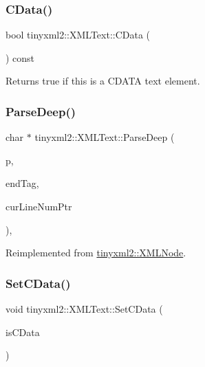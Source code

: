 \subsubsection{\texorpdfstring{C\+Data()}{CData()}}
{\footnotesize\ttfamily bool tinyxml2\+::\+X\+M\+L\+Text\+::\+C\+Data (\begin{DoxyParamCaption}{ }\end{DoxyParamCaption}) const\hspace{0.3cm}{\ttfamily [inline]}}



Returns true if this is a C\+D\+A\+TA text element. 

\mbox{\label{classtinyxml2_1_1_x_m_l_text_a9810dd9b82c9020baa0c3bdcb4469aac}} 
\subsubsection{\texorpdfstring{Parse\+Deep()}{ParseDeep()}}
{\footnotesize\ttfamily char $\ast$ tinyxml2\+::\+X\+M\+L\+Text\+::\+Parse\+Deep (\begin{DoxyParamCaption}\item[{char $\ast$}]{p,  }\item[{\hyperlink{classtinyxml2_1_1_str_pair}{Str\+Pair} $\ast$}]{end\+Tag,  }\item[{int $\ast$}]{cur\+Line\+Num\+Ptr }\end{DoxyParamCaption})\hspace{0.3cm}{\ttfamily [protected]}, {\ttfamily [virtual]}}



Reimplemented from \hyperlink{classtinyxml2_1_1_x_m_l_node_a0afc27892998f31735f6225edb40a40d}{tinyxml2\+::\+X\+M\+L\+Node}.

\mbox{\label{classtinyxml2_1_1_x_m_l_text_ad080357d76ab7cc59d7651249949329d}} 
\subsubsection{\texorpdfstring{Set\+C\+Data()}{SetCData()}}
{\footnotesize\ttfamily void tinyxml2\+::\+X\+M\+L\+Text\+::\+Set\+C\+Data (\begin{DoxyParamCaption}\item[{bool}]{is\+C\+Data }\end{DoxyParamCaption})\hspace{0.3cm}{\ttfamily [inline]}}



